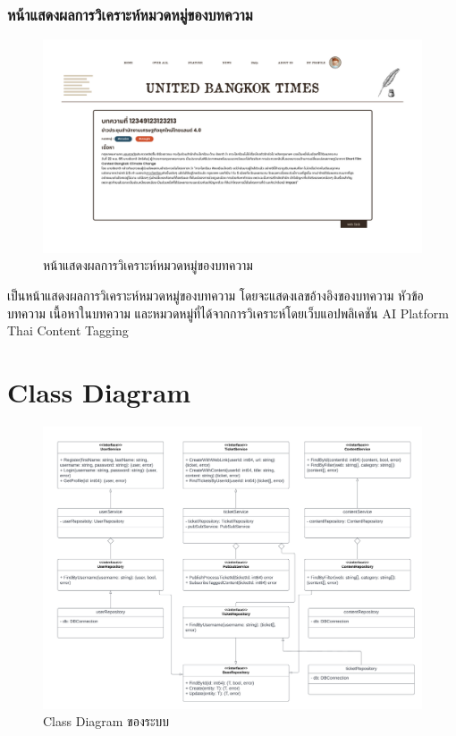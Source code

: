 \documentclass[12pt,oneside,openright,a4paper]{cpe-thai-project}
\begin{document}
\subsubsection{หน้าแสดงผลการวิเคราะห์หมวดหมู่ของบทความ}
\begin{figure}[!ht]\centering
  \includegraphics[width=15cm]{./img/project_ui/12.png} 
  \caption{หน้าแสดงผลการวิเคราะห์หมวดหมู่ของบทความ}\label{fig:result} 
\end{figure} 
\hspace*{1cm}เป็นหน้าแสดงผลการวิเคราะห์หมวดหมู่ของบทความ โดยจะแสดงเลขอ้างอิงของบทความ หัวข้อบทความ เนื้อหาในบทความ 
และหมวดหมู่ที่ได้จากการวิเคราะห์โดยเว็บแอปพลิเคชัน AI Platform Thai Content Tagging 

\section{Class Diagram}
\begin{figure}[!ht]\centering
  \includegraphics[width=13 cm]{./img/class_dia.png} 
  \caption{Class Diagram ของระบบ}\label{fig:class_diagram} 
\end{figure} 
\end{document}
